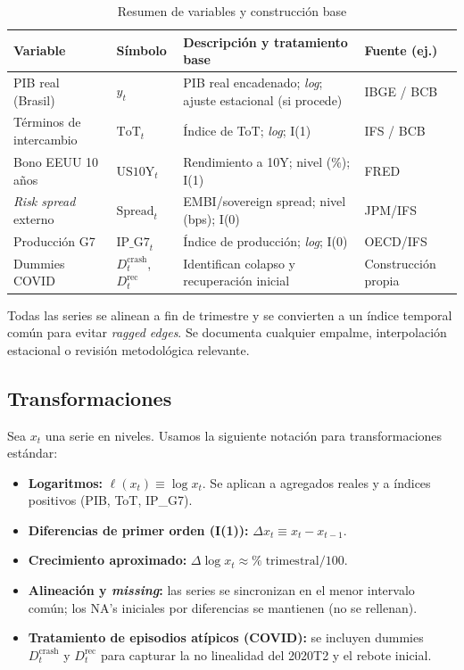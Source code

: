 \documentclass[11pt,a4paper]{article}
\newcommand{\1}{\mathbf{1}}
\begin{document}
\begin{table}[h!]
\centering
\caption{Resumen de variables y construcción base}
\label{tab:variables}
\begin{tabular}{@{}p{4.2cm}p{3.2cm}p{6.6cm}p{3.5cm}@{}}
\toprule
\textbf{Variable} & \textbf{Símbolo} & \textbf{Descripción y tratamiento base} & \textbf{Fuente (ej.)} \\
\midrule
PIB real (Brasil)            & $y_t$               & PIB real encadenado; \textit{log}; ajuste estacional (si procede) & IBGE / BCB \\
Términos de intercambio      & $\text{ToT}_t$      & Índice de ToT; \textit{log}; I(1) & IFS / BCB \\
Bono EEUU 10 años            & $\text{US10Y}_t$    & Rendimiento a 10Y; nivel (\%); I(1) & FRED \\
\textit{Risk spread} externo & $\text{Spread}_t$   & EMBI/sovereign spread; nivel (bps); I(0) & JPM/IFS \\
Producción G7                & $\text{IP\_G7}_t$   & Índice de producción; \textit{log}; I(0) & OECD/IFS \\
Dummies COVID                & $D^{\text{crash}}_t$, $D^{\text{rec}}_t$ & Identifican colapso y recuperación inicial & Construcción propia \\
\bottomrule
\end{tabular}
\end{table}

Todas las series se alinean a fin de trimestre y se convierten a un índice temporal común para evitar \emph{ragged edges}. Se documenta cualquier empalme, interpolación estacional o revisión metodológica relevante.

\subsection{Transformaciones}

Sea $x_t$ una serie en niveles. Usamos la siguiente notación para transformaciones estándar:

\begin{itemize}
  \item \textbf{Logaritmos:} $\ell(x_t) \equiv \log x_t$. Se aplican a agregados reales y a índices positivos (PIB, ToT, IP\_G7).
  \item \textbf{Diferencias de primer orden (I(1)):} $\Delta x_t \equiv x_t - x_{t-1}$.
  \item \textbf{Crecimiento aproximado:} $\Delta \log x_t \approx \%\; \text{trimestral} / 100$.
  \item \textbf{Alineación y \textit{missing}:} las series se sincronizan en el menor intervalo común; los NA's iniciales por diferencias se mantienen (no se rellenan).
  \item \textbf{Tratamiento de episodios atípicos (COVID):} se incluyen dummies $D^{\text{crash}}_t$ y $D^{\text{rec}}_t$ para capturar la no linealidad del 2020T2 y el rebote inicial.
\end{itemize}
\end{document}
